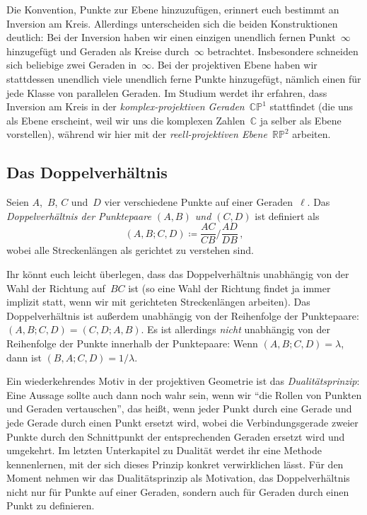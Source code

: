 Die Konvention, Punkte zur Ebene hinzuzufügen, erinnert euch bestimmt an Inversion am Kreis. Allerdings unterscheiden sich die beiden Konstruktionen deutlich: Bei der Inversion haben wir einen einzigen unendlich fernen Punkt~$\infty$ hinzugefügt und Geraden als Kreise durch~$\infty$ betrachtet. Insbesondere schneiden sich beliebige zwei Geraden in~$\infty$. Bei der projektiven Ebene haben wir stattdessen unendlich viele unendlich ferne Punkte hinzugefügt, nämlich einen für jede Klasse von parallelen Geraden. Im Studium werdet ihr erfahren, dass Inversion am Kreis in der \emph{komplex-projektiven Geraden~$\mathbb{CP}^1$} stattfindet (die uns als Ebene erscheint, weil wir uns die komplexen Zahlen~$\mathbb C$ ja selber als Ebene vorstellen), während wir hier mit der \emph{reell-projektiven Ebene~$\mathbb{RP}^2$} arbeiten.

\subsection*{Das Doppelverhältnis}
\begin{definition}
	Seien $A$,~$B$, $C$ und~$D$ vier verschiedene Punkte auf einer Geraden~$\ell$. Das \emph{Doppelverhältnis der Punktepaare $(A,B)$ und $(C,D)$} ist definiert als
	\begin{equation*}
		(A,B;C,D)\coloneqq \frac{AC}{CB}\bigg/\!\frac{AD}{DB}\,,
	\end{equation*}
	wobei alle Streckenlängen als gerichtet zu verstehen sind.
\end{definition}

Ihr könnt euch leicht überlegen, dass das Doppelverhältnis unabhängig von der Wahl der Richtung auf~$BC$ ist (so eine Wahl der Richtung findet ja immer implizit statt, wenn wir mit gerichteten Streckenlängen arbeiten). Das Doppelverhältnis ist außerdem unabhängig von der Reihenfolge der Punktepaare: $(A,B;C,D)=(C,D;A,B)$. Es ist allerdings \emph{nicht} unabhängig von der Reihenfolge der Punkte innerhalb der Punktepaare: Wenn $(A,B;C,D)=\lambda$, dann ist $(B,A;C,D)=1/\lambda$.

Ein wiederkehrendes Motiv in der projektiven Geometrie ist das \emph{Dualitätsprinzip}: Eine Aussage sollte auch dann noch wahr sein, wenn wir \enquote{die Rollen von Punkten und Geraden vertauschen}, das heißt, wenn jeder Punkt durch eine Gerade und jede Gerade durch einen Punkt ersetzt wird, wobei die Verbindungsgerade zweier Punkte durch den Schnittpunkt der entsprechenden Geraden ersetzt wird und umgekehrt. Im letzten Unterkapitel zu Dualität werdet ihr eine Methode kennenlernen, mit der sich dieses Prinzip konkret verwirklichen lässt. Für den Moment nehmen wir das Dualitätsprinzip als Motivation, das Doppelverhältnis nicht nur für Punkte auf einer Geraden, sondern auch für Geraden durch einen Punkt zu definieren. 

